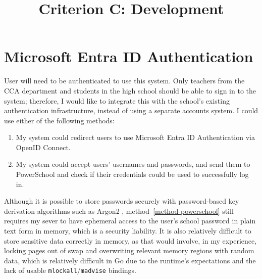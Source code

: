 

\usepackage{nameref}
\usepackage{xr}

\newcommand{\fileref}[1]{\texttt{\nameref*{#1}} (appendix page~\pageref*{#1})}
\newcommand{\coderef}[1]{(appendix page~\pageref*{#1})}
\newcommand{\codenref}[1]{\texttt{#1} (appendix page~\pageref*{#1})}

\usepackage{minted}

\usepackage[]{tikz}
\usetikzlibrary{arrows.meta, positioning}

\title{Criterion C: Development}


\maketitle

\renewcommand{\contentsname}{List of Techniques}
\tableofcontents

\section{Microsoft Entra ID Authentication}

User will need to be authenticated to use this system. Only teachers from the CCA department and students in the high school should be able to sign in to the system; therefore, I would like to integrate this with the school's existing authentication infrastructure, instead of using a separate accounts system. I could use either of the following methods:

\begin{enumerate}
	\item \label{method-entra} My system could redirect users to use Microsoft Entra ID Authentication via OpenID Connect.
	\item \label{method-powerschool} My system could accept users' usernames and passwords, and send them to PowerSchool and check if their credentials could be used to successfully log in.
\end{enumerate}

Although it is possible to store passwords securely with password-based key derivation algorithms such as Argon2 \parencite{argon2}, method~\ref{method-powerschool} still requires my sever to have ephemeral access to the user's school password in plain text form in memory, which is a security liability. It is also relatively difficult to store sensitive data correctly in memory, as that would involve, in my experience, locking pages out of swap and overwriting relevant memory regions with random data, which is relatively difficult in Go due to the runtime's expectations and the lack of usable \texttt{mlockall}/\texttt{madvise} bindings.

